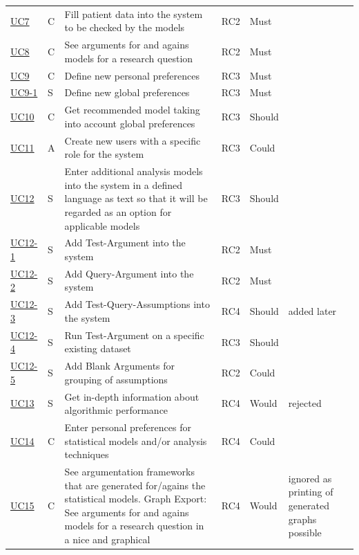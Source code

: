 \begin{landscape}
\begin{longtable}{ l l p{10.5cm} l l p{3cm} }
		\href{https://trello.com/c/DidVQKAS}{UC7}   &   C & 	Fill patient data into the system to be checked by the models & RC2 & Must &  \\
		\href{https://trello.com/c/be2088JH}{UC8}	& 	C & 	See arguments for and agains models for a research question & RC2 & Must &   \\
		\href{https://trello.com/c/Ca9mA3uA}{UC9}   &   C & 	Define new personal preferences & RC3 & Must &   \\
		\href{https://trello.com/c/Ca9mA3uA}{UC9-1}   &   S & 	Define new global preferences & RC3 & Must &   \\
		\href{https://trello.com/c/1s656fA9}{UC10}  &   C & 	Get recommended model taking into account global preferences & RC3 & Should & 	 \\
		\href{https://trello.com/c/xUDStSOK}{UC11}  &   A & 	Create new users with a specific role for the system & RC3 & Could &    \\
		\href{https://trello.com/c/5UMo7o6U}{UC12}  &   S & 	Enter additional analysis models into the system in a defined language as text so that it will be regarded as an option for applicable models	& RC3 & Should & \\
		\href{https://trello.com/c/2V6Cl65u}{UC12-1}&   S & 	Add Test-Argument into the system & RC2 & Must & \\
		\href{https://trello.com/c/OwM2Z7wt}{UC12-2}&   S & 	Add Query-Argument into the system & RC2 & Must &  \\
		\href{https://trello.com/c/VThxB5aS}{UC12-3}&   S & 	Add Test-Query-Assumptions into the system & RC4 & Should & added later\\
		\href{https://trello.com/c/CkpJUNPW}{UC12-4}&   S & 	Run Test-Argument on a specific existing dataset & RC3	& Should &  \\
		\href{https://trello.com/c/Rg6GPnNE}{UC12-5}&   S & 	Add Blank Arguments for grouping of assumptions & RC2 & Could & \\
		\href{https://trello.com/c/ORlMByiQ}{UC13}  &   S & 	Get in-depth information about algorithmic performance & RC4 & Would & rejected\\
		\href{https://trello.com/c/NcV3lo4w}{UC14}  &   C & 	Enter personal preferences for statistical models and/or analysis techniques & RC4 & Could &   \\
		\href{https://trello.com/c/BOUu2hKN}{UC15}  &   C & 	See argumentation frameworks that are generated for/agains the statistical models. Graph Export: See arguments for and agains models for a research question in a nice and graphical &RC4 & Would & 	 ignored as printing of generated graphs possible  \\

\end{longtable}
\end{landscape}
